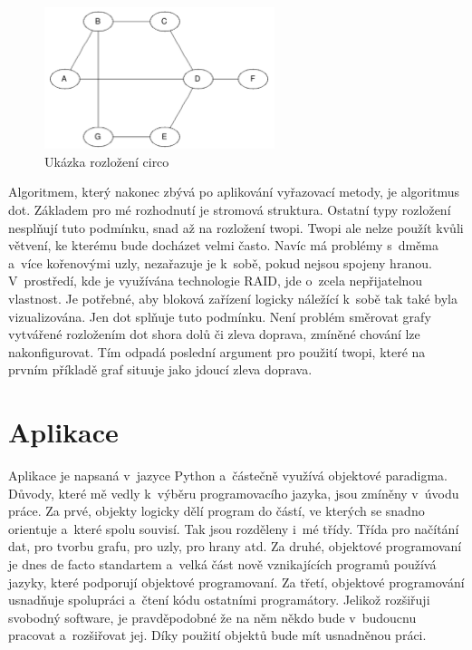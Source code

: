 \documentclass[color,table,oneside,nolot,nolof]{fithesis}
\begin{document}
\begin{figure}
	\label{Ukázka rozložení circo}
	\caption{Ukázka rozložení circo}
	\centering
	\includegraphics[width=0.6\textwidth]{pictures/circo_example.png} 
\end{figure}

	Algoritmem, který nakonec zbývá po aplikování vyřazovací metody, je algoritmus dot. 
	Základem pro mé rozhodnutí je stromová struktura. Ostatní typy rozložení nesplňují tuto podmínku, snad až na rozložení twopi. Twopi ale nelze použít kvůli větvení,
	ke kterému bude docházet velmi často. Navíc má problémy s~dměma a~více kořenovými uzly, nezařazuje je k~sobě, pokud nejsou spojeny hranou. V~prostředí, kde je využívána technologie
	RAID, jde o~zcela nepřijatelnou vlastnost. Je potřebné, aby bloková zařízení logicky náležící k~sobě tak také byla vizualizována. Jen dot splňuje tuto podmínku. Není problém směrovat grafy 
	vytvářené rozložením dot shora dolů či zleva doprava, zmíněné chování lze nakonfigurovat. Tím odpadá poslední argument pro použití twopi, které na prvním příkladě graf situuje jako
	jdoucí zleva doprava.

\chapter{Aplikace}
	Aplikace je napsaná v~jazyce Python a~částečně využívá objektové paradigma. Důvody, které mě vedly k~výběru programovacího jazyka, jsou zmíněny v~úvodu práce. Za prvé, objekty logicky
	dělí program do částí, ve kterých se snadno orientuje a~které spolu souvisí. Tak jsou rozděleny i~mé třídy. Třída pro načítání dat, pro tvorbu grafu, pro uzly, pro hrany atd.
	Za druhé, objektové programovaní je dnes de facto standartem a~velká část nově vznikajících programů používá jazyky, které podporují objektové programovaní. Za třetí,
	objektové programování usnadňuje spolupráci a~čtení kódu ostatními programátory. Jelikož rozšiřuji svobodný software, je pravděpodobné že na něm někdo bude v~budoucnu pracovat
	a~rozšiřovat jej. Díky použití objektů bude mít usnadněnou práci.
	
\end{document}
